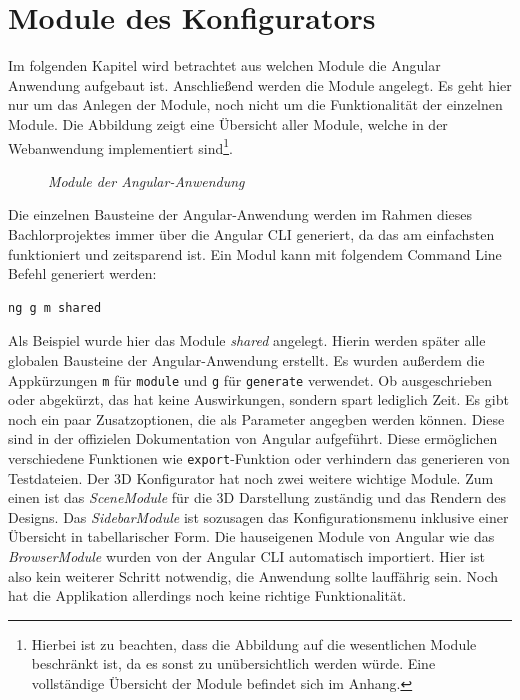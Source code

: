 \section{Module des Konfigurators}
\label{sec:umsetzung}
%
Im folgenden Kapitel wird betrachtet aus welchen Module die Angular Anwendung aufgebaut ist. Anschließend werden die Module angelegt. Es geht hier nur um das Anlegen der Module, noch nicht um die Funktionalität der einzelnen Module. Die Abbildung zeigt eine Übersicht aller Module, welche in der Webanwendung implementiert sind\footnote{Hierbei ist zu beachten, dass die Abbildung auf die wesentlichen Module beschränkt ist, da es sonst zu unübersichtlich werden würde. Eine vollständige Übersicht der Module befindet sich im Anhang.}.
\begin{figure}[h]
	\centering
	{}
	\caption[Übersicht der Module]{\textit{Module der Angular-Anwendung}}
	\label{fig:module}
\end{figure}
Die einzelnen Bausteine der Angular-Anwendung werden im Rahmen dieses Bachlorprojektes immer über die Angular CLI generiert, da das am einfachsten funktioniert und zeitsparend ist. Ein Modul kann mit folgendem Command Line Befehl generiert werden:
%
\begin{lstlisting}
ng g m shared
\end{lstlisting}
%
Als Beispiel wurde hier das Module \textit{shared} angelegt. Hierin werden später alle globalen Bausteine der Angular-Anwendung erstellt. Es wurden außerdem die Appkürzungen \texttt{m} für \texttt{module} und \texttt{g} für \texttt{generate} verwendet. Ob ausgeschrieben oder abgekürzt, das hat keine Auswirkungen, sondern spart lediglich Zeit. Es gibt noch ein paar Zusatzoptionen, die als Parameter angegben werden können. Diese sind in der offizielen Dokumentation von Angular aufgeführt. Diese ermöglichen verschiedene Funktionen wie \texttt{export}-Funktion oder verhindern das generieren von Testdateien. Der 3D Konfigurator hat noch zwei weitere wichtige Module. Zum einen ist das \textit{SceneModule} für die 3D Darstellung zuständig und das Rendern des Designs. Das \textit{SidebarModule} ist sozusagen das Konfigurationsmenu inklusive einer Übersicht in tabellarischer Form. Die hauseigenen Module von Angular wie das \textit{BrowserModule} wurden von der Angular CLI automatisch importiert. Hier ist also kein weiterer Schritt notwendig, die Anwendung sollte lauffährig sein. Noch hat die Applikation allerdings noch keine richtige Funktionalität.
%

